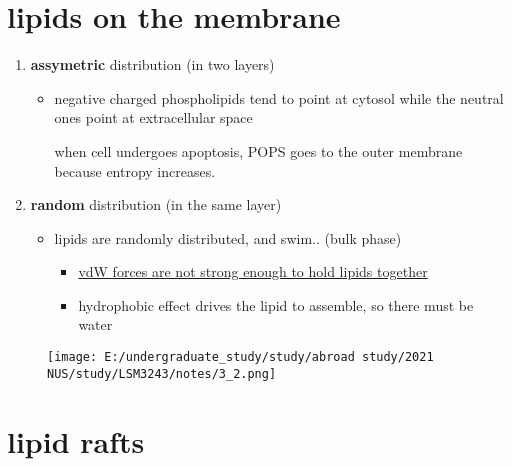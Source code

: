 \hypertarget{lipids-on-the-membrane}{%
	\section{lipids on the membrane}\label{lipids-on-the-membrane}}

\begin{enumerate}
	\def\labelenumi{\arabic{enumi}.}
	\item
	\textbf{assymetric} distribution (in two layers)
	
	\begin{itemize}
		\item
		negative charged phospholipids tend to point at cytosol while the
		neutral ones point at extracellular space
		
		when cell undergoes apoptosis, POPS goes to the outer membrane because entropy increases.
	\end{itemize}
	\item
	\textbf{random} distribution (in the same layer)
	
	\begin{itemize}
		\item
		lipids are randomly distributed, and swim.. (bulk phase)
		
		\begin{itemize}
			\item
			\underline{vdW forces are not strong enough to hold lipids together}
			\item
			hydrophobic effect drives the lipid to assemble, so there must be
			water
		\end{itemize}
	\end{itemize}
\end{enumerate}

\begin{figure}
	\centering
	\texttt{[image: E:/undergraduate\_study/study/abroad study/2021 NUS/study/LSM3243/notes/3\_2.png]}
\end{figure}

\hypertarget{lipid-rafts}{%
	\section{lipid rafts}\label{lipid-rafts}}

